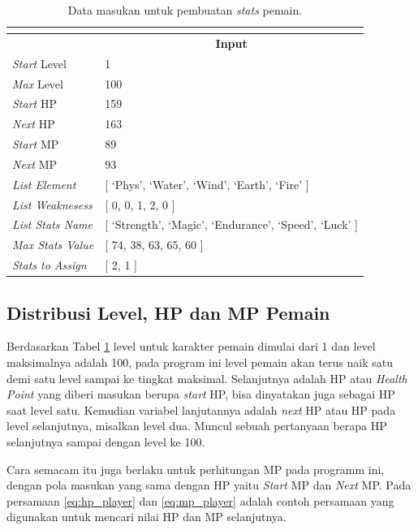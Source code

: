 \begin{longtable}{|l|l|}
	\caption{Data masukan untuk pembuatan \textit{stats} pemain.}
	\vspace{1ex}
	\label{tb:player_input_variable}\\
	\hline
	\rowcolor[HTML]{9B9B9B} 
	\multicolumn{1}{|c|}{\cellcolor[HTML]{9B9B9B}\textbf{Variabel}} & \multicolumn{1}{c|}{\cellcolor[HTML]{9B9B9B}\textbf{Input}} \\ \hline
	\textit{Start} Level & 1 \\ \hline
	\textit{Max} Level & 100 \\ \hline
	\textit{Start} HP & 159 \\ \hline
	\textit{Next} HP & 163 \\ \hline
	\textit{Start} MP & 89 \\ \hline
	\textit{Next} MP & 93 \\ \hline
	\textit{List Element} & {[} `Phys', `Water', `Wind', `Earth', `Fire' {]} \\ \hline
	\textit{List Weaknesess} & {[} 0, 0, 1, 2, 0 {]} \\ \hline
	\textit{List Stats Name} & {[} `Strength', `Magic', `Endurance', `Speed', `Luck' {]} \\ \hline
	\textit{Max Stats Value} & {[} 74, 38, 63, 65, 60 {]} \\ \hline
	\textit{Stats to Assign} & {[} 2, 1 {]} \\ \hline
\end{longtable}

\subsection{Distribusi Level, HP dan MP Pemain}
\label{sec:sub_sec3_player_level_hp_mp}
\vspace{1ex}

Berdasarkan Tabel \ref{tb:player_input_variable} level untuk karakter pemain dimulai dari 1 dan level maksimalnya adalah 100, pada program ini level pemain akan terus naik satu demi satu level sampai ke tingkat maksimal. Selanjutnya adalah HP atau \textit{Health Point} yang diberi masukan berupa \textit{start} HP, bisa dinyatakan juga sebagai HP saat level satu. Kemudian variabel lanjutannya adalah \textit{next} HP atau HP pada level selanjutnya, misalkan level dua. Muncul sebuah pertanyaan berapa HP selanjutnya sampai dengan level ke 100. 
\vspace{1ex}

Cara semacam itu juga berlaku untuk perhitungan MP pada programm ini, dengan pola masukan yang sama dengan HP yaitu \textit{Start} MP dan \textit{Next} MP. Pada persamaan \ref{eq:hp_player} dan \ref{eq:mp_player} adalah contoh persamaan yang digunakan untuk mencari nilai HP dan MP selanjutnya.
\vspace{1ex}

